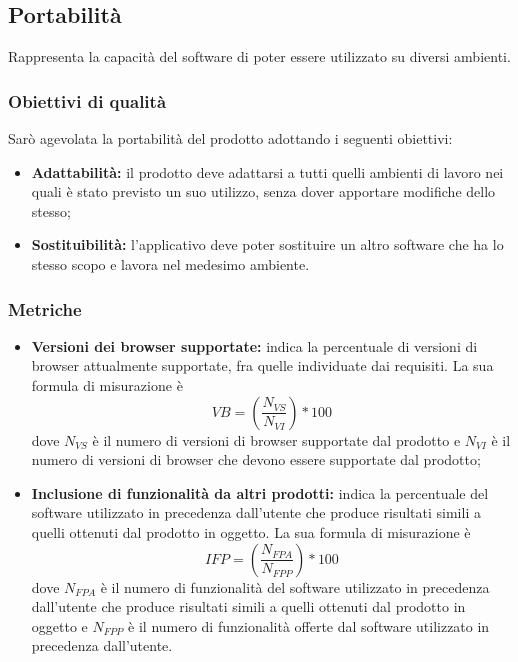 \documentclass[PianoDiQualifica.tex]{subfiles}
\begin{document}
\subsection{Portabilità}
Rappresenta la capacità del software di poter essere utilizzato su diversi ambienti.
\subsubsection{Obiettivi di qualità}
Sarò agevolata la portabilità del prodotto adottando i seguenti obiettivi:
\begin{itemize}
	\item \textbf{Adattabilità:} il prodotto deve adattarsi a tutti quelli ambienti di lavoro nei quali è stato previsto un suo utilizzo, senza dover apportare modifiche dello stesso;
	\item \textbf{Sostituibilità:} l'applicativo deve poter sostituire un altro software che ha lo stesso scopo e lavora nel medesimo ambiente.
\end{itemize}
\subsubsection{Metriche}
\begin{itemize}
	\item \textbf{Versioni dei browser supportate:} indica la percentuale di versioni di browser attualmente supportate, fra quelle individuate dai requisiti. La sua formula di misurazione è \[VB=(\frac{N_{VS}}{N_{VI}})*100\] dove $ N_{VS} $ è il numero di versioni di browser supportate dal prodotto e $ N_{VI} $ è il numero di versioni di browser che devono essere supportate dal prodotto;
	\item \textbf{Inclusione di funzionalità da altri prodotti:} indica la percentuale del software utilizzato in precedenza dall'utente che produce risultati simili a quelli ottenuti dal prodotto in oggetto. La sua formula di misurazione è \[IFP=(\frac{N_{FPA}}{N_{FPP}})*100\] dove $ N_{FPA} $ è il numero di funzionalità del software utilizzato in precedenza dall'utente che produce risultati simili a quelli ottenuti dal prodotto in oggetto e $ N_{FPP} $ è il numero di funzionalità offerte dal software utilizzato in precedenza dall'utente. 
\end{itemize}
\newpage
\end{document}
